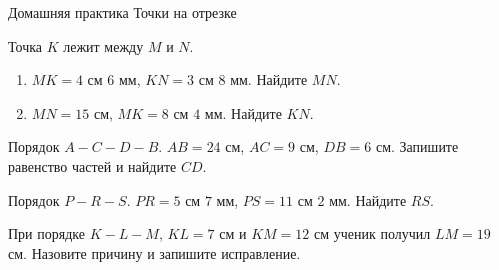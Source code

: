 \worksheettitle
  {Домашняя практика}
  { Точки на отрезке}

\studentnameblock

\begin{practicebox}
  Точка $K$ лежит между $M$ и $N$.
  \begin{enumerate}[label=\alph*)]
    \item $MK=4$ см $6$ мм, $KN=3$ см $8$ мм. Найдите $MN$.
    \item $MN=15$ см, $MK=8$ см $4$ мм. Найдите $KN$.
  \end{enumerate}
\end{practicebox}

\begin{practicebox}
  Порядок $A-C-D-B$. $AB=24$ см, $AC=9$ см, $DB=6$ см.
  Запишите равенство частей и найдите $CD$. 
\end{practicebox}

\begin{practicebox}
  Порядок $P-R-S$. $PR=5$ см $7$ мм, $PS=11$ см $2$ мм.
  Найдите $RS$. 
\end{practicebox}

\begin{warningbox}
  При порядке $K-L-M$, $KL=7$ см и $KM=12$ см ученик получил
  $LM=19$ см. Назовите причину и запишите исправление.
\end{warningbox}
